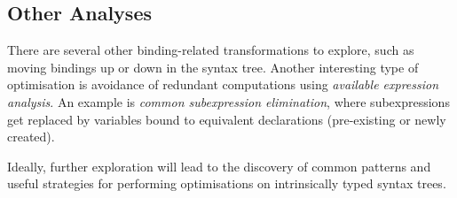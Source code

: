 \documentclass[11pt,a4paper]{article}
\begin{document}
\subsection{Other Analyses}

There are several other binding-related transformations to explore,
such as moving bindings up or down in the syntax tree.
Another interesting type of optimisation is avoidance of redundant computations
using \emph{available expression analysis}.
An example is \emph{common subexpression elimination},
where subexpressions get replaced by variables bound to equivalent declarations
(pre-existing or newly created).

Ideally, further exploration will lead to the discovery of common patterns
and useful strategies for performing optimisations on intrinsically typed syntax trees.



{}
\end{document}
